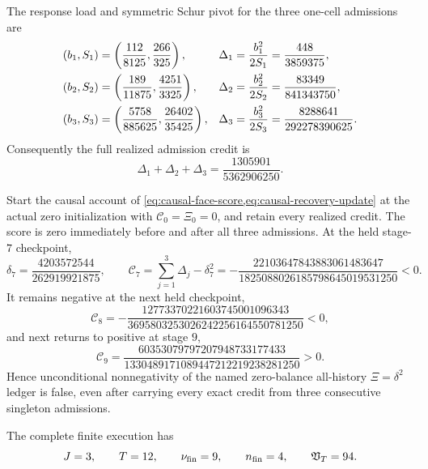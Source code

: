 \begin{proposition}
The response load and symmetric Schur pivot for the three one-cell
admissions are
\begin{align}
 (b_1,S_1)&=\left(\frac{112}{8125},\frac{266}{325}\right),
 &\Delta_1=\frac{b_1^2}{2S_1}&=\frac{448}{3859375},
 \notag\\
 (b_2,S_2)&=\left(\frac{189}{11875},\frac{4251}{3325}\right),
 &\Delta_2=\frac{b_2^2}{2S_2}&=\frac{83349}{841343750},
 \notag\\
 (b_3,S_3)&=\left(\frac{5758}{885625},\frac{26402}{35425}\right),
 &\Delta_3=\frac{b_3^2}{2S_3}
 &=\frac{8288641}{292278390625}.
 \label{eq:three-admission-schur-drops}
\end{align}
Consequently the full realized admission credit is
\begin{equation}
 \Delta_1+\Delta_2+\Delta_3
 =\frac{1305901}{5362906250}.
 \label{eq:three-admission-total-credit}
\end{equation}

Start the causal account of
\cref{eq:causal-face-score,eq:causal-recovery-update} at the actual zero
initialization with $\mathcal C_0=\Xi_0=0$, and retain every realized credit.
The score is zero immediately before and after all three admissions.  At the
held stage-$7$ checkpoint,
\begin{equation}
 \delta_7=\frac{4203572544}{262919921875},
 \qquad
 \mathcal C_7
 =\sum_{j=1}^3\Delta_j-\delta_7^2
 =-\frac{22103647843883061483647}
 {1825088026185798645019531250}<0.
 \label{eq:three-admission-stage-seven-stop}
\end{equation}
It remains negative at the next held checkpoint,
\begin{equation}
 \mathcal C_8
 =-\frac{12773370221603745001096343}
 {3695803253026242256164550781250}<0,
 \label{eq:three-admission-stage-eight-stop}
\end{equation}
and next returns to positive at stage $9$,
\begin{equation}
 \mathcal C_9
 =\frac{60353079797207948733177433}
 {1330489171089447212219238281250}>0.
 \label{eq:three-admission-stage-nine-go}
\end{equation}
Hence unconditional nonnegativity of the named zero-balance all-history
$\Xi=\delta^2$ ledger is false, even after carrying every exact credit from
three consecutive singleton admissions.

The complete finite execution has
\begin{equation}
 J=3,
 \qquad T=12,
 \qquad \nu_{\rm fin}=9,
 \qquad n_{\rm fin}=4,
 \qquad \mathfrak V_T=94.
 \label{eq:three-admission-finite-ledger}
\end{equation}
\end{proposition}

